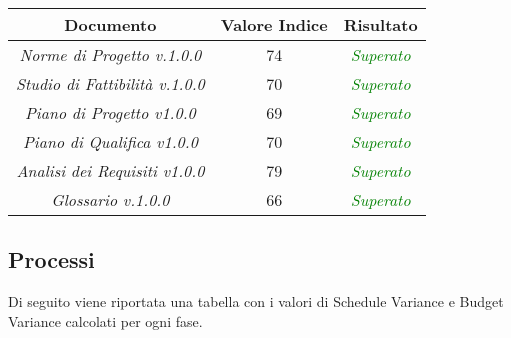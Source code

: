 \begin{center}
\begin{tabular}{|c|c|c|}
\hline 
\textbf{Documento} & \textbf{Valore Indice} & \textbf{Risultato} \\ 
\hline
\textit{Norme di Progetto v.1.0.0} & 74 & \textcolor{green}{\textit{Superato}} \\ 
\textit{Studio di Fattibilità v.1.0.0} & 70 & \textcolor{green}{\textit{Superato}} \\ 
\textit{Piano di Progetto v1.0.0} & 69 & \textcolor{green}{\textit{Superato}} \\ 
\textit{Piano di Qualifica v1.0.0} & 70 & \textcolor{green}{\textit{Superato}} \\ 
\textit{Analisi dei Requisiti v1.0.0} & 79 & \textcolor{green}{\textit{Superato}} \\ 
\textit{Glossario v.1.0.0} & 66 & \textcolor{green}{\textit{Superato}} \\ 
\hline 
\end{tabular}

\end{center}

\subsection{Processi}

Di seguito  viene riportata una tabella con i valori di Schedule Variance e Budget Variance calcolati per ogni fase.

\vspace{3mm}

